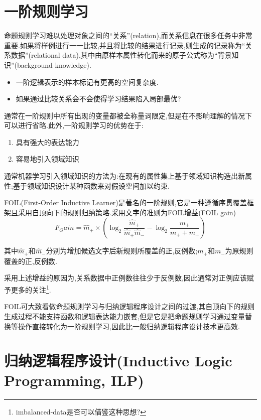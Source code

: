 \section{一阶规则学习}

命题规则学习难以处理对象之间的``关系''(relation),而关系信息在很多任务中非常重要.如果将样例进行一一比较,并且将比较的结果进行记录,则生成的记录称为``关系数据''(relational data),其中由原样本属性转化而来的原子公式称为``背景知识''(background knowledge).
\begin{itemize}
\item 一阶逻辑表示的样本标记有更高的空间复杂度.
\item 如果通过比较关系会不会使得学习结果陷入局部最优?
\end{itemize}

通常在一阶规则中所有出现的变量都被全称量词限定,但是在不影响理解的情况下可以进行省略.此外,一阶规则学习的优势在于:
\begin{enumerate}
\item 具有强大的表达能力
\item 容易地引入领域知识
\end{enumerate}

通常机器学习引入领域知识的方法为:在现有的属性集上基于领域知识构造出新属性;基于领域知识设计某种函数来对假设空间加以约束.

FOIL(First-Order Inductive Learner)是著名的一阶规则,它是一种遵循序贯覆盖框架且采用自顶向下的规则归纳策略.采用文字的准则为FOIL增益(FOIL gain)
\begin{equation}
F_Gain=\hat m_+\times(\log_2\frac{\hat m_+}{\hat m_+\hat m_-}-\log_2\frac{m_+}{m_++m_+})
\end{equation}

其中$\hat m_+$和$\hat m_-$分别为增加候选文字后新规则所覆盖的正,反例数;$m_+$和$m_-$为原规则覆盖的正,反例数.

采用上述增益的原因为,关系数据中正例数往往少于反例数,因此通常对正例应该赋予更多的关注\footnote{imbalanced-data是否可以借鉴这种思想?}.

FOIL可大致看做命题规则学习与归纳逻辑程序设计之间的过渡,其自顶向下的规则生成过程不能支持函数和逻辑表达能力嵌套,但是它是把命题规则学习通过变量替换等操作直接转化为一阶规则学习,因此比一般归纳逻辑程序设计技术更高效.

\section{归纳逻辑程序设计(Inductive Logic Programming, ILP)}

